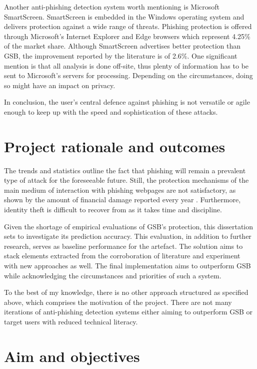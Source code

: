 Another anti-phishing detection system worth mentioning is Microsoft SmartScreen. SmartScreen is embedded in the Windows operating system and delivers protection against a wide range of threats. Phishing protection is offered through Microsoft's Internet Explorer and Edge browsers which represent 4.25\% of the market share. Although SmartScreen advertises better protection than GSB, the improvement reported by the literature is of 2.6\%. One significant mention is that all analysis is done off-site, thus plenty of information has to be sent to Microsoft's servers for processing. Depending on the circumstances, doing so might have an impact on privacy.

In conclusion, the user's central defence against phishing is not versatile or agile enough to keep up with the speed and sophistication of these attacks.


\section{Project rationale and outcomes}
\label{sec:project_rationale_and_outcomes}
The trends and statistics outline the fact that phishing will remain a prevalent type of attack for the foreseeable future. Still, the protection mechanisms of the main medium of interaction with phishing webpages are not satisfactory, as shown by the amount of financial damage reported every year \citep{APWG_Q42019}. Furthermore, identity theft is difficult to recover from as it takes time and discipline.

Given the shortage of empirical evaluations of GSB's protection, this dissertation sets to investigate its prediction accuracy. This evaluation, in addition to further research, serves as baseline performance for the artefact. The solution aims to stack elements extracted from the corroboration of literature and experiment with new approaches as well. The final implementation aims to outperform GSB while acknowledging the circumstances and priorities of such a system.

To the best of my knowledge, there is no other approach structured as specified above, which comprises the motivation of the project. There are not many iterations of anti-phishing detection systems either aiming to outperform GSB or target users with reduced technical literacy.


\section{Aim and objectives}

